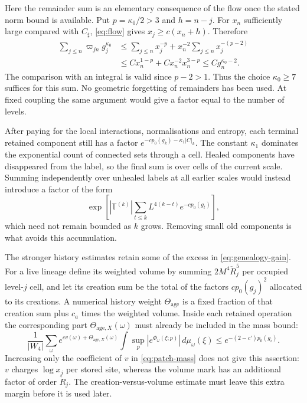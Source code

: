 \documentclass[11pt,letterpaper,reqno]{amsart}
\theoremstyle{definition}
\theoremstyle{remark}
\begin{document}
Here the remainder sum is an elementary consequence of
the flow once the stated norm bound is available.
Put $p=\kappa_0/2>3$ and $h=n-j$. For $x_n$
sufficiently large compared with $C_\sharp$,
\eqref{eq:flow} gives $x_j\ge c(x_n+h)$. Therefore
\[
 \begin{split}
 \sum_{j\le n}\varpi_{jn}g_j^{\kappa_0}
 &\le\sum_{j\le n}x_j^{-p}
                +x_n^{-2}\sum_{j\le n}x_j^{-(p-2)}\\
 &\le Cx_n^{1-p}
                +Cx_n^{-2}x_n^{3-p}
 \le Cg_n^{\kappa_0-2}.
 \end{split}
\]
The comparison with an integral is valid since
$p-2>1$. Thus the choice $\kappa_0\ge7$ suffices
for this sum. No geometric forgetting of remainders
has been used. At fixed coupling the same argument
would give a factor equal to the number of levels.

After paying for the local interactions, normalisations and entropy,
each terminal retained component still has a factor
$e^{-cp_0(g_k)-\kappa_1|C|_k}$. The constant $\kappa_1$ dominates
the exponential count of connected sets through a cell. Healed
components have disappeared from the label, so the final sum is over
cells of the current scale. Summing independently over unhealed
labels at all earlier scales would instead introduce a factor of the
form
\[
 \exp\!\left[
 |\mathbb T^{(k)}|\sum_{t\le k}
             L^{4(k-t)}e^{-cp_0(g_t)}\right],
\]
which need not remain bounded as $k$ grows. Removing small old
components is what avoids this accumulation.

The stronger history estimates retain some of the excess in
\eqref{eq:genealogy-gain}. For a live lineage define its weighted
volume by summing $2M^4\check R_j^5$ per occupied level-$j$ cell,
and let its creation sum be the total of the factors
$cp_0(g_j)^2$ allocated to its creations. A numerical history weight
$\Theta_{\mathrm{age}}$ is a fixed fraction of that creation sum plus $c_a$ times the
weighted volume. Inside each retained operation the corresponding
part $\Theta_{\mathrm{age},X}(\omega)$ must already be included in the mass bound:
\[
 \frac1{|W_4|}\sum_\omega e^{cv(\omega)+\Theta_{\mathrm{age},X}(\omega)}
       \int\sup_p|e^{\Phi_\omega(\xi;p)}|\,d\mu_\omega(\xi)
 \le e^{-(2-c')p_0(g_i)}.
\]
Increasing only the coefficient of $v$ in \eqref{eq:patch-mass}
does not give this assertion: $v$ charges $\log x_j$ per stored
site, whereas the volume mark has an additional factor of order
$\check R_j$. The creation-versus-volume estimate must leave this
extra margin before it is used later.
\end{document}
